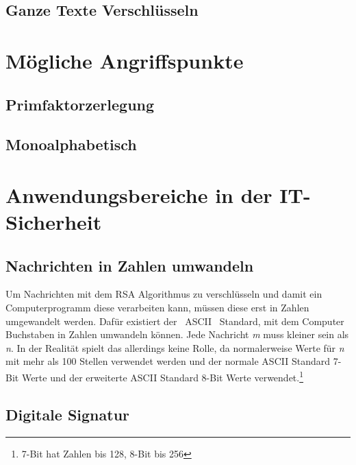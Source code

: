\documentclass[14pt,a4paper]{scrartcl}
\begin{document}
	\subsection{Ganze Texte Verschlüsseln}

\section{Mögliche Angriffspunkte}
	\subsection{Primfaktorzerlegung}
	\subsection{Monoalphabetisch}

\section{Anwendungsbereiche in der IT- Sicherheit}
	\subsection{Nachrichten in Zahlen umwandeln}
	Um Nachrichten mit dem RSA Algorithmus zu verschlüsseln und damit ein Computerprogramm diese verarbeiten kann, müssen diese erst in Zahlen umgewandelt werden. Dafür existiert der ~ASCII~ Standard, mit dem Computer Buchstaben in Zahlen umwandeln können. Jede Nachricht \textit{m} muss kleiner sein als \textit{n}. In der Realität spielt das allerdings keine Rolle, da normalerweise Werte für \textit{n} mit mehr als 100 Stellen verwendet werden und der normale ASCII Standard 7-Bit Werte und der erweiterte ASCII Standard 8-Bit Werte verwendet.\footnote{\label{foot:1}7-Bit hat Zahlen bis 128, 8-Bit bis 256}
	
	\subsection{Digitale Signatur}
	
\end{document}

